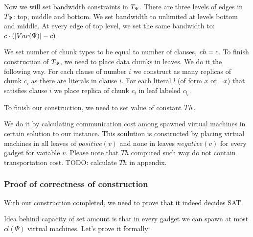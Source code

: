 Now we will set bandwidth constraints in $T_{\Psi}$. There are three
levels of edges in $T_{\Psi}$: top, middle and bottom. We set
bandwidth to unlimited at levels bottom and middle. At every edge of
top level, we set the same bandwidth to: $c \cdot (|Var(\Psi)| -
c)$.

We set number of chunk types to be equal to number of clauses, $ch =
c$. To finish construction of $T_{\Psi}$, we need to place data chunks in
leaves. We do it the following way. For each clause of number $i$ we
construct as many replicas of chunk $c_i$ as there are literals in
clause $i$. For each literal $l$ (of form $x$ or $\neg x$) that satisfies clause $i$ we place
replica of chunk $c_i$ in leaf labeled $c_{l_i}$.

To finish our construction, we need to set value of constant $Th$. 

 We
do it by calculating communication cost among spawned virtual machines in
certain solution to our instance. This soulution is constructed by placing
virtual machines in all leaves of $positive(v)$ and none in leaves
$negative(v)$ for every gadget for variable $v$. Please note that $Th$
computed such way do not contain transportation cost. TODO: calculate
$Th$ in appendix.

\subsubsection{Proof of correctness of construction}

With our construction completed, we need to prove that it indeed
decides SAT.

Idea behind capacity of set amount is that in every gadget we can
spawn at most $cl(\Psi)$ virtual machines. Let's prove it formally:

